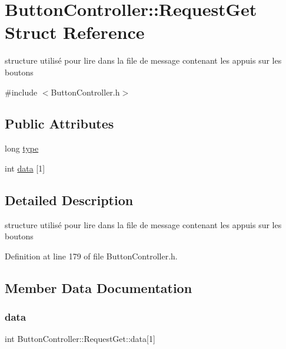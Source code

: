 \hypertarget{struct_button_controller_1_1_request_get}{}\section{Button\+Controller\+:\+:Request\+Get Struct Reference}
\label{struct_button_controller_1_1_request_get}


structure utilisé pour lire dans la file de message contenant les appuis sur les boutons  




{\ttfamily \#include $<$Button\+Controller.\+h$>$}

\subsection*{Public Attributes}
\begin{DoxyCompactItemize}
\item 
long \hyperlink{struct_button_controller_1_1_request_get_a7eb93a1564fcd3b26017e05dea128bc1}{type}
\item 
int \hyperlink{struct_button_controller_1_1_request_get_a340e0e48c71f446aff39ef48003ecf24}{data} \mbox{[}1\mbox{]}
\end{DoxyCompactItemize}


\subsection{Detailed Description}
structure utilisé pour lire dans la file de message contenant les appuis sur les boutons 

Definition at line 179 of file Button\+Controller.\+h.



\subsection{Member Data Documentation}
\mbox{\label{struct_button_controller_1_1_request_get_a340e0e48c71f446aff39ef48003ecf24}} 
\subsubsection{\texorpdfstring{data}{data}}
{\footnotesize\ttfamily int Button\+Controller\+::\+Request\+Get\+::data\mbox{[}1\mbox{]}}



